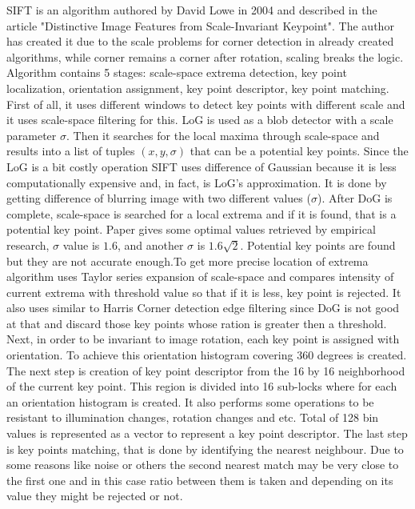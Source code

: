 \documentclass[../../../../main]{subfiles}
\begin{document}
\ac{SIFT} is an algorithm authored by David Lowe in 2004 and described in the article "Distinctive Image Features from Scale-Invariant Keypoint". The author has created it due to the scale problems for corner detection in already created algorithms, while corner remains a corner after rotation, scaling breaks the logic. Algorithm contains 5 stages: scale-space extrema detection, key point localization, orientation assignment, key point descriptor, key point matching. First of all, it uses different windows to detect key points with different scale and it uses scale-space filtering for this. \ac{LoG} is used as a blob detector with a scale parameter $\sigma$. Then it searches for the local maxima through scale-space and results into a list of tuples $(x,y,\sigma)$ that can be a potential key points. Since the  \ac{LoG} is a bit costly operation \ac{SIFT} uses difference of Gaussian because it is less computationally expensive and, in fact, is \ac{LoG}'s approximation. It is done by getting difference of blurring image with two different values ($\sigma$). After \ac{DoG} is complete, scale-space is searched for a local extrema and if it is found, that is a potential key point. Paper gives some optimal values retrieved by empirical research, $\sigma$ value is $1.6$, and another $\sigma$ is $1.6\sqrt{2}$. Potential key points are found but they are not accurate enough.To get more precise location of extrema algorithm uses Taylor series expansion of scale-space and compares intensity of current extrema with threshold value so that if it is less, key point is rejected. It also uses similar to Harris Corner detection edge filtering since \ac{DoG} is not good at that and discard those key points whose ration is greater then a threshold. Next, in order to be invariant to image rotation, each key point is assigned with orientation. To achieve this orientation histogram covering 360 degrees is created. The next step is creation of key point descriptor from the 16 by 16 neighborhood of the current key point. This region is divided into 16 sub-locks where for each an orientation histogram is created. It also performs some operations to be resistant to illumination changes, rotation changes and etc. Total of 128 bin values is represented as a vector to represent a key point descriptor. The last step is key points matching, that is done by identifying the nearest neighbour. Due to some reasons like noise or others the second nearest match may be very close to the first one and in this case ratio between them is taken and depending on its value they might be rejected or not.
\end{document}
